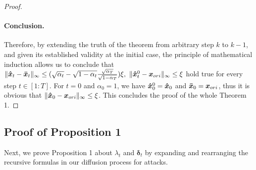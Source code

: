 \documentclass{article}
\newtheorem{proof}{Proof}
\begin{document}
\begin{proof}
\paragraph{Conclusion.} Therefore, by extending the truth of the theorem from arbitrary step $k$ to $k-1$, and given its established validity at the initial case, the principle of mathematical induction allows us to conclude that $\|\boldsymbol{\Hat{x}}_{t} - \boldsymbol{\Bar{x}}_{t}\|_{\infty} \leq (\sqrt{\alpha_{t}} - \sqrt{1 - \alpha_{t}} \frac{\sqrt{\alpha_T}}{\sqrt{1-\alpha_T}})\xi, \ \|\boldsymbol{\Hat{x}}_{t}^{0} - \boldsymbol{x}_{ori}\|_{\infty}\leq\xi$ hold true for every step $t\in[1:T]$. For $t=0$ and $\alpha_0=1$, we have $\boldsymbol{\Hat{x}}_{0}^{0} = \boldsymbol{\Hat{x}}_{0}$ and $\boldsymbol{\Bar{x}}_{0} = \boldsymbol{{x}}_{ori}$, thus it is obvious that $\|\boldsymbol{\Hat{x}}_{0} - \boldsymbol{x}_{ori}\|_{\infty}\leq\xi$. This concludes the proof of the whole Theorem 1.
\end{proof}


\subsection{Proof of Proposition 1}  \label{app:B3}
Next, we prove Proposition 1 about $\lambda_t$ and $\boldsymbol{\delta}_t$ by expanding and rearranging the recursive formulas in our diffusion process for attacks.
\end{document}
